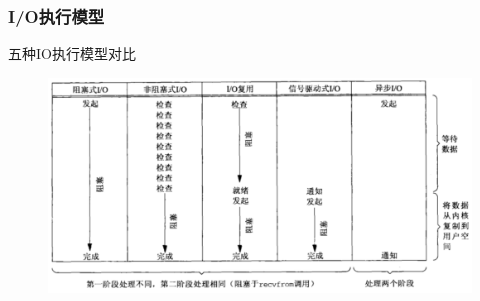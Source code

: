 \begin{frame}[fragile]
    \frametitle{I/O执行模型}
      五种IO执行模型对比
    \begin{figure}
        \includegraphics[width=0.8\linewidth]{figs/io-modes-compare.png}
    \end{figure}
\end{frame}

